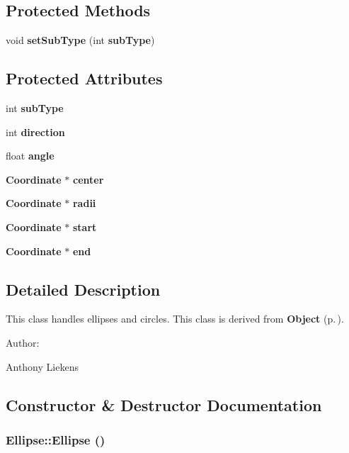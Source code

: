 \subsection*{Protected Methods}
\begin{CompactItemize}
\item 
void {\bf set\-Sub\-Type} (int {\bf sub\-Type})
\end{CompactItemize}
\subsection*{Protected Attributes}
\begin{CompactItemize}
\item 
int {\bf sub\-Type}
\item 
int {\bf direction}
\item 
float {\bf angle}
\item 
{\bf Coordinate} $\ast$ {\bf center}
\item 
{\bf Coordinate} $\ast$ {\bf radii}
\item 
{\bf Coordinate} $\ast$ {\bf start}
\item 
{\bf Coordinate} $\ast$ {\bf end}
\end{CompactItemize}


\subsection{Detailed Description}
This class handles ellipses and circles. This class is derived from {\bf Object} {\rm (p.\,\pageref{classObject})}. \begin{Desc}
\item[Author: ]\par
Anthony Liekens \end{Desc}




\subsection{Constructor \& Destructor Documentation}
\subsubsection{\setlength{\rightskip}{0pt plus 5cm}Ellipse::Ellipse ()}\label{classEllipse_a0}


